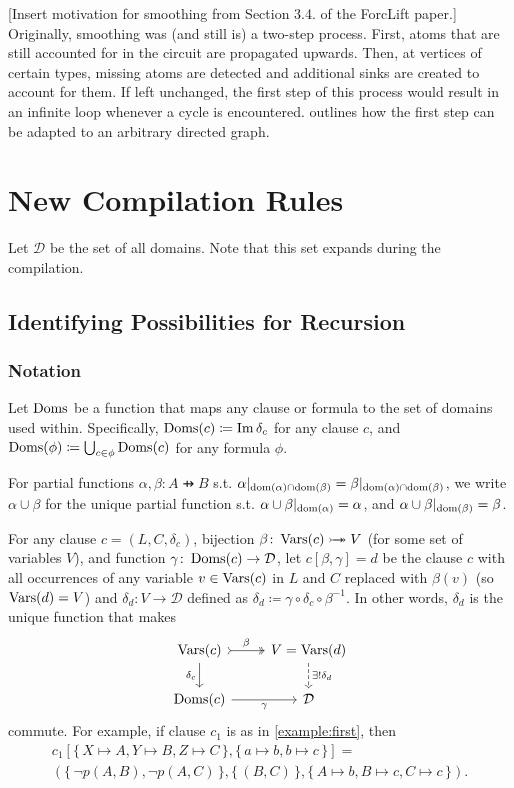 [Insert motivation for smoothing from Section 3.4. of the ForcLift paper.] Originally, smoothing was (and still is) a two-step process. First, atoms that are still accounted for in the circuit are propagated upwards. Then, at vertices of certain types, missing atoms are detected and additional sinks are created to account for them. If left unchanged, the first step of this process would result in an infinite loop whenever a cycle is encountered.  outlines how the first step can be adapted to an arbitrary directed graph.

\section{New Compilation Rules}

Let $\mathcal{D}$ be the set of all domains. Note that this set expands during the compilation.

\subsection{Identifying Possibilities for Recursion}

\subsubsection{Notation}

Let $\operatorname{Doms}$ be a function that maps any clause or formula to the set of domains used within. Specifically, $\operatorname{Doms}(c) \coloneqq \operatorname{Im} \delta_c$ for any clause $c$, and $\operatorname{Doms}(\phi) \coloneqq \bigcup_{c \in \phi} \operatorname{Doms}(c)$ for any formula $\phi$.

For partial functions $\alpha, \beta\colon A \pfun B$ s.t. $\alpha|_{\operatorname{dom}(\alpha) \cap \operatorname{dom}(\beta)} = \beta|_{\operatorname{dom}(\alpha) \cap \operatorname{dom}(\beta)}$, we write $\alpha \cup \beta$ for the unique partial function s.t. $\alpha \cup \beta|_{\operatorname{dom}(\alpha)} = \alpha$, and $\alpha \cup \beta|_{\operatorname{dom}(\beta)} = \beta$.

For any clause $c = (L, C, \delta_c)$, bijection $\beta\colon \operatorname{Vars}(c) \mathrel{\rightarrowtail\kern-1.9ex\twoheadrightarrow} V$ (for some set of variables $V$), and function $\gamma\colon \operatorname{Doms}(c) \to \mathcal{D}$, let $c[\beta, \gamma] = d$ be the clause $c$ with all occurrences of any variable $v \in \operatorname{Vars}(c)$ in $L$ and $C$ replaced with $\beta(v)$ (so $\operatorname{Vars}(d) = V$) and $\delta_d\colon V \to \mathcal{D}$ defined as $\delta_d \coloneqq \gamma \circ \delta_c \circ \beta^{-1}$. In other words, $\delta_d$ is the unique function that makes
\[
\begin{tikzcd}
  \Vars(c) \ar[r, tail, two heads, "\beta"] \arrow[d, swap, "\delta_c"] & V = \Vars(d) \ar[d, dashed, "\exists!\delta_d"] \\
  \Doms(c) \ar[r, swap, "\gamma"] & \mathcal{D}
\end{tikzcd}
\]
commute. For example, if clause $c_1$ is as in \cref{example:first}, then
\begin{multline*}
  c_1[\{\, X \mapsto A, Y \mapsto B, Z \mapsto C \,\}, \{\, a \mapsto b, b \mapsto c \,\}] = \\
  (\{\, \neg p(A, B), \neg p(A, C) \,\}, \{\, (B, C) \,\}, \{\, A \mapsto b, B \mapsto c, C \mapsto c \,\}).
\end{multline*}

